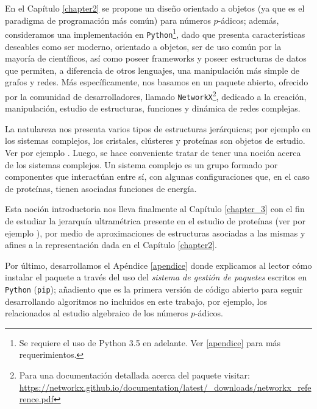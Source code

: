 En el Capítulo \ref{chapter2} se propone un diseño orientado a objetos (ya que es el paradigma de programación más común) para números $p$-ádicos; además, consideramos una implementación en \texttt{Python}\footnote{Se requiere el uso de Python 3.5 en adelante. Ver \ref{apendice} para más requerimientos.}, dado que presenta características deseables como ser moderno, orientado a objetos, ser de uso común por la mayoría de científicos, así como poseer frameworks y poseer estructuras de datos que permiten, a diferencia de otros lenguajes, una manipulación más simple de grafos y redes. Más específicamente, nos basamos en un paquete abierto, ofrecido por la comunidad de desarrolladores, llamado \texttt{NetworkX}\footnote{Para una documentación detallada acerca del paquete visitar: \url{https://networkx.github.io/documentation/latest/_downloads/networkx_reference.pdf}}, dedicado a la creación, manipulación, estudio de estructuras, funciones y dinámica de redes complejas.

La natulareza nos presenta varios tipos de estructuras jerárquicas; por ejemplo en los sistemas complejos, los cristales, clústeres y proteínas son objetos de estudio. Ver por ejemplo \cite{Av-3,A-B-O,Av-5}. Luego, se hace conveniente tratar de tener una noción acerca de los sistemas complejos. Un sistema complejo es un grupo formado por componentes que interactúan entre sí, con algunas configuraciones que, en el caso de proteínas, tienen asociadas funciones de energía.

Esta noción introductoria nos lleva finalmente al Capítulo \ref{chapter_3} con el fin de estudiar la jerarquía ultramétrica presente en el estudio de proteínas (ver por ejemplo \cite{Av-5}), por medio de aproximaciones de estructuras asociadas a las mismas y afines a la representación dada en el Capítulo \ref{chapter2}.

Por último, desarrollamos el Apéndice \ref{apendice} donde explicamos al lector cómo instalar el paquete a través del uso del \textit{sistema de gestión de paquetes} escritos en \texttt{Python} (\texttt{pip}); añadiento que es la primera versión de código abierto para seguir desarrollando algoritmos no incluidos en este trabajo, por ejemplo, los relacionados al estudio algebraico de los números $p$-ádicos. 
\newpage
